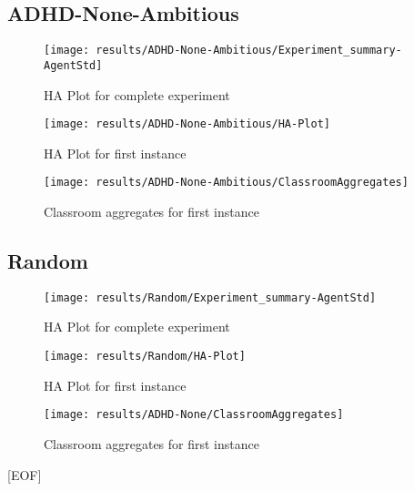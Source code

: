 \subsection{ADHD-None-Ambitious}

\begin{figure}[H]
    \centering
    \texttt{[image: results/ADHD-None-Ambitious/Experiment\_summary-AgentStd]}
    \caption{HA Plot for complete experiment}
\end{figure}

\begin{figure}[H]
    \centering
    \texttt{[image: results/ADHD-None-Ambitious/HA-Plot]}
    \caption{HA Plot for first instance}
\end{figure}

\begin{figure}[H]
    \centering
    \texttt{[image: results/ADHD-None-Ambitious/ClassroomAggregates]}
    \caption{Classroom aggregates for first instance}
    \label{result:NA-Classroom}
\end{figure}

\subsection{Random}

\begin{figure}[H]
    \centering
    \texttt{[image: results/Random/Experiment\_summary-AgentStd]}
    \caption{HA Plot for complete experiment}
\end{figure}

\begin{figure}[H]
    \centering
    \texttt{[image: results/Random/HA-Plot]}
    \caption{HA Plot for first instance}
\end{figure}

\begin{figure}[H]
    \centering
    \texttt{[image: results/ADHD-None/ClassroomAggregates]}
    \caption{Classroom aggregates for first instance}
\end{figure}

[EOF]

